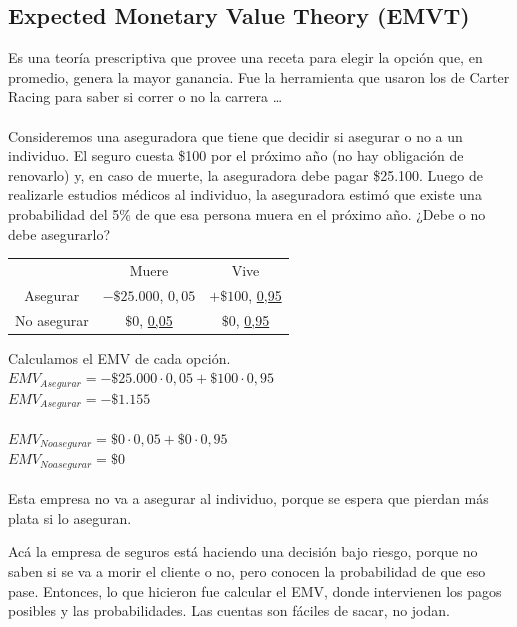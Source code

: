 \documentclass{article}
\newcommand{\ulcolor}[2][Red]{\setulcolor{#1}\ul{#2}}
\begin{document}
        \subsection*{Expected Monetary Value Theory (EMVT)}
            Es una teoría prescriptiva que provee una receta para elegir la opción que, en promedio, genera la mayor ganancia. Fue la herramienta que usaron los de Carter Racing para saber si correr o no la carrera \ldots
            \\
            \\
            Consideremos una aseguradora que tiene que decidir si asegurar o no a un individuo. El seguro cuesta \$100 por el próximo año (no hay obligación de renovarlo) y, en caso de muerte, la aseguradora debe pagar \$25.100. Luego de realizarle estudios médicos al individuo, la aseguradora estimó que existe una probabilidad del 5\% de que esa persona muera en el próximo año. ¿Debe o no debe asegurarlo?
            \\
            \begin{table}[h]
                \begin{tabular}{ccc}
                                & Muere & Vive \\
                    Asegurar    & \ulcolor[Red]{$- \mathdollar 25.000$}, \ulcolor[Green]{$0,05$} & \ulcolor[Red]{$+ \mathdollar 100$}, \ulcolor[Green]{0,95} \\
                    No asegurar & \ulcolor[Red]{$\mathdollar 0$}, \ulcolor[Green]{0,05} & \ulcolor[Red]{$\mathdollar 0$}, \ulcolor[Green]{0,95} \\
                \end{tabular}
            \end{table}
            Calculamos el EMV de cada opción.
            \\
            \(EMV_{Asegurar} = -\mathdollar 25.000 \cdot 0,05 + \mathdollar 100 \cdot 0,95\) \\
            \(EMV_{Asegurar} = -\mathdollar 1.155\) \\ \\
            \(EMV_{No asegurar} = \mathdollar 0 \cdot 0,05 + \mathdollar 0 \cdot 0,95\) \\
            \(EMV_{No asegurar} = \mathdollar 0\) \\
            \\
            Esta empresa no va a asegurar al individuo, porque se espera que pierdan más plata si lo aseguran.

            Acá la empresa de seguros está haciendo una decisión bajo riesgo, porque no saben si se va a morir el cliente o no, pero conocen la probabilidad de que eso pase. Entonces, lo que hicieron fue calcular el EMV, donde intervienen los pagos posibles y las probabilidades. Las cuentas son fáciles de sacar, no jodan.
\end{document}
